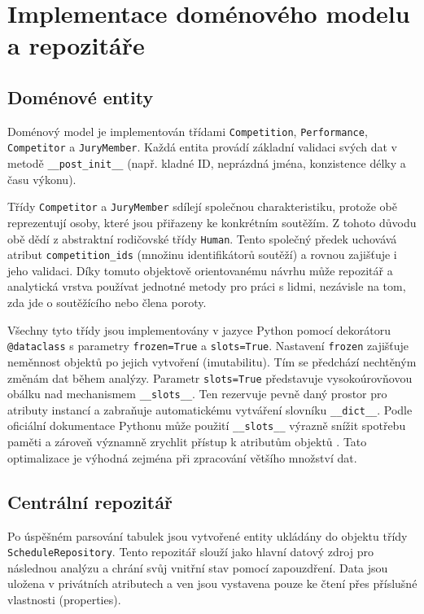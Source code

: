 \documentclass[czech, kiv, ba, he, iso690alph, pdf]{fasthesis}
\begin{document}
		\section{Implementace doménového modelu a repozitáře}
	
			\subsection{Doménové entity}
				Doménový model je implementován třídami \texttt{Competition}, \texttt{Performance}, \texttt{Competitor} a \texttt{JuryMember}. Každá entita provádí základní validaci svých dat v metodě \texttt{\_\_post\_init\_\_} (např. kladné ID, neprázdná jména, konzistence délky a času výkonu).
			
				Třídy \texttt{Competitor} a \texttt{JuryMember} sdílejí společnou charakteristiku, protože obě reprezentují osoby, které jsou přiřazeny ke konkrétním soutěžím. Z tohoto důvodu obě dědí z abstraktní rodičovské třídy \texttt{Human}. Tento společný předek uchovává atribut \texttt{competition\_ids} (množinu identifikátorů soutěží) a rovnou zajišťuje i jeho validaci. Díky tomuto objektově orientovanému návrhu může repozitář a analytická vrstva používat jednotné metody pro práci s lidmi, nezávisle na tom, zda jde o soutěžícího nebo člena poroty.
			
				Všechny tyto třídy jsou implementovány v jazyce Python pomocí dekorátoru \texttt{@dataclass} s parametry \texttt{frozen=True} a \texttt{slots=True}. Nastavení \texttt{frozen} zajišťuje neměnnost objektů po jejich vytvoření (imutabilitu). Tím se předchází nechtěným změnám dat během analýzy. Parametr \texttt{slots=True} představuje vysokoúrovňovou obálku nad mechanismem \texttt{\_\_slots\_\_}. Ten rezervuje pevně daný prostor pro atributy instancí a zabraňuje automatickému vytváření slovníku \texttt{\_\_dict\_\_}. Podle oficiální dokumentace Pythonu může použití \texttt{\_\_slots\_\_} výrazně snížit spotřebu paměti a zároveň významně zrychlit přístup k atributům objektů \cite{python_slots}. Tato optimalizace je výhodná zejména při zpracování většího množství dat.
	
			\subsection{Centrální repozitář}
				Po úspěšném parsování tabulek jsou vytvořené entity ukládány do objektu třídy \texttt{ScheduleRepository}. Tento repozitář slouží jako hlavní datový zdroj pro následnou analýzu a chrání svůj vnitřní stav pomocí zapouzdření. Data jsou uložena v privátních atributech a ven jsou vystavena pouze ke čtení přes příslušné vlastnosti (properties).
			
\end{document}
